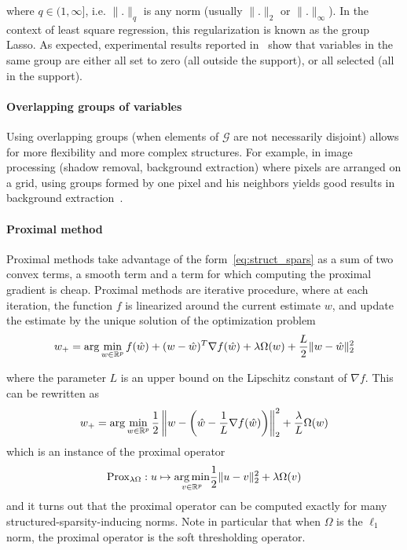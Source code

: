 where $q \in (1, \infty]$, i.e. $\|.\|_q$ is any norm (usually $\|.\|_2$ or $\|.\|_\infty$). In the context of least square regression, this regularization is known as the group Lasso. As expected, experimental results reported in~\cite{Bach:2011kx} show that variables in the same group are either all set to zero (all outside the support), or all selected (all in the support).

\paragraph{Overlapping groups of variables}
Using overlapping groups (when elements of $\mathcal{G}$ are not necessarily disjoint) allows for more flexibility and more complex structures. For example, in image processing (shadow removal, background extraction) where pixels are arranged on a grid, using groups formed by one pixel and his neighbors yields good results in background extraction~\cite{Cevher_sparsesignal}.


\paragraph{Proximal method}
Proximal methods take advantage of the form~\ref{eq:struct_spars} as a sum of two convex terms, a smooth term and a term for which computing the proximal gradient is cheap. Proximal methods are iterative procedure, where at each iteration, the function $f$ is linearized around the current estimate $w$, and update the estimate by the unique solution of the optimization problem
\[
w_+ = \arg \min_{w \in {\mathbb R}^p} f(\hat{w}) + (w - \hat{w})^T\nabla f(\hat{w}) + \lambda \Omega(w) + \frac{L}{2}\|w - \hat{w}\|_2^2
\]

where the parameter $L$ is an upper bound on the Lipschitz constant of $\nabla f$. This can be rewritten as
\[
w_+ = \arg \min_{w \in {\mathbb R}^p} \frac{1}{2} \left\|w - \left( \hat{w} - \frac{1}{L} \nabla f(\hat{w}) \right) \right\|_2^2 + \frac{\lambda}{L} \Omega(w)
\]
which is an instance of the proximal operator
\[
\text{Prox}_{\lambda \Omega} : u \mapsto \underset{v \in {\mathbb R}^p }{\arg \min} \frac{1}{2}\|u - v\|_2^2 + \lambda \Omega(v)
\]
and it turns out that the proximal operator can be computed exactly for many structured-sparsity-inducing norms. Note in particular that when $\Omega$ is the $\ell_1$ norm, the proximal operator is the soft thresholding operator.

